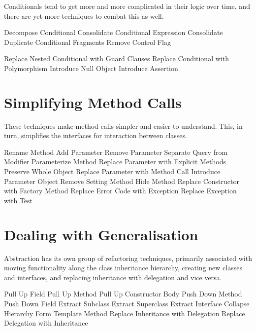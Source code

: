 \documentclass[11pt,a4paper,oneside]{book}
\begin{document}
Conditionals tend to get more and more complicated in their logic over time, and there are yet more techniques to combat this as well.

    Decompose Conditional
    Consolidate Conditional Expression
    Consolidate Duplicate Conditional Fragments
    Remove Control Flag

    Replace Nested Conditional with Guard Clauses
    Replace Conditional with Polymorphism
    Introduce Null Object
    Introduce Assertion




\section{Simplifying Method Calls}

These techniques make method calls simpler and easier to understand. This, in turn, simplifies the interfaces for interaction between classes.

    Rename Method
    Add Parameter
    Remove Parameter
    Separate Query from Modifier
    Parameterize Method
    Replace Parameter with Explicit Methods
    Preserve Whole Object
    Replace Parameter with Method Call
    Introduce Parameter Object
    Remove Setting Method
    Hide Method
    Replace Constructor with Factory Method
    Replace Error Code with Exception
    Replace Exception with Test




\section{Dealing with Generalisation}

Abstraction has its own group of refactoring techniques, primarily associated with moving functionality along the class inheritance hierarchy, creating new classes and interfaces, and replacing inheritance with delegation and vice versa.

    Pull Up Field
    Pull Up Method
    Pull Up Constructor Body
    Push Down Method
    Push Down Field
    Extract Subclass
    Extract Superclass
    Extract Interface
    Collapse Hierarchy
    Form Template Method
    Replace Inheritance with Delegation
    Replace Delegation with Inheritance
\end{document}
